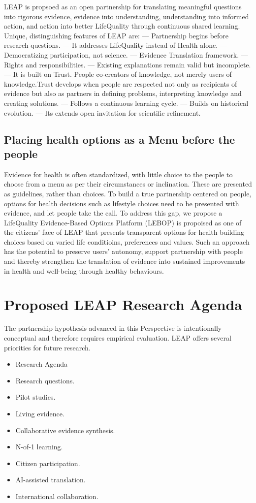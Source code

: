 \documentclass{article}
\begin{document}
LEAP is propsoed as an open partnership for translating meaningful questions into rigorous evidence, evidence into understanding, understanding into informed action, and action into better LifeQuality through continuous shared learning. Unique, distinguishing features of LEAP are:
— Partnership begins before research questions.
— It addresses LifeQuality instead of Health alone.
— Democratizing participation, not science.
— Evidence Translation framework.
— Rights and responsibilities.
— Existing explanations remain valid but incomplete.
— It is built on Trust. People co-creators of knowledge, not merely users of knowledge.Trust develops when people are respected not only as recipients of evidence but also as partners in defining problems, interpreting knowledge and creating solutions.
— Follows a continuous learning cycle.
— Builds on historical evolution.
— Its extends open invitation for scientific refinement.
\subsection{Placing health options as a Menu before the people}
\label{sec:org73de56b}
Evidence for health is often standardized, with little choice to the people to choose from a menu as per their circumstances or inclination. These are presented as guidelines, rather than choices. To build a true partnership centered on people, options for health decisions such as lifestyle choices need to be presented with evidence, and let people take the call. To address this gap,  we propose a LifeQuality Evidence-Based Options Platform (LEBOP) is propoised as one of the citizens' face of LEAP that presents transparent options for health building choices based on varied life conditioins, preferences and values. Such an approach has  the potential to preserve users' autonomy,  support partnership with people and thereby strengthen the translation of evidence into sustained improvements in health and well-being through healthy behaviours.
\section{Proposed LEAP Research Agenda}
\label{sec:org13c5c4c}
The partnership hypothesis advanced in this Perspective is intentionally conceptual and therefore requires empirical evaluation. LEAP offers several priorities for future research.
\begin{itemize}
\item Research Agenda
\item Research questions.
\item Pilot studies.
\item Living evidence.
\item Collaborative evidence synthesis.
\item N-of-1 learning.
\item Citizen participation.
\item AI-assisted translation.
\item International collaboration.
\end{itemize}
\end{document}
